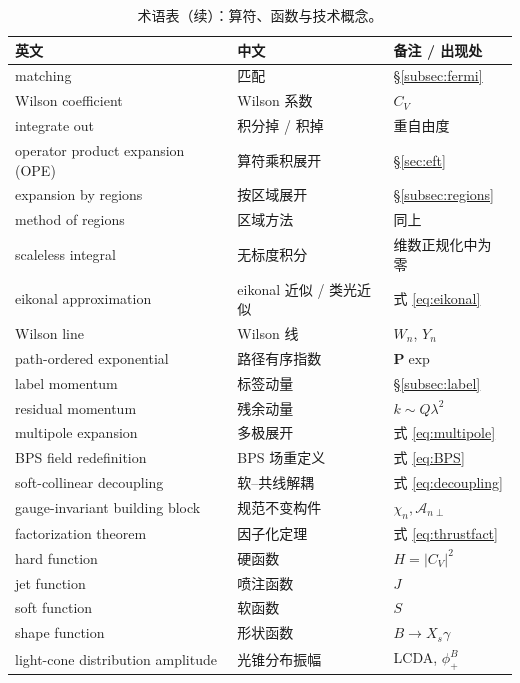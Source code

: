 \documentclass[UTF8,a4paper,11pt]{ctexart}
\theoremstyle{definition}
\theoremstyle{remark}
\theoremstyle{plain}
\newcommand{\Pexp}{\mathbf{P}\exp}
\begin{document}
\begin{table}[htbp]
\centering
\caption{术语表（续）：算符、函数与技术概念。}
\label{tab:terms2}
\begin{tabular}{@{}lll@{}}
\toprule
英文 & 中文 & 备注 / 出现处 \\
\midrule
matching                          & 匹配                & \S\ref{subsec:fermi} \\
Wilson coefficient                & Wilson 系数         & $C_V$ \\
integrate out                     & 积分掉 / 积掉       & 重自由度 \\
operator product expansion (OPE)  & 算符乘积展开        & \S\ref{sec:eft} \\
expansion by regions              & 按区域展开          & \S\ref{subsec:regions} \\
method of regions                 & 区域方法            & 同上 \\
scaleless integral                & 无标度积分          & 维数正规化中为零 \\
eikonal approximation             & eikonal 近似 / 类光近似 & 式 \eqref{eq:eikonal} \\
Wilson line                       & Wilson 线           & $W_n$, $Y_n$ \\
path-ordered exponential          & 路径有序指数        & $\Pexp$ \\
label momentum                    & 标签动量            & \S\ref{subsec:label} \\
residual momentum                 & 残余动量            & $k\sim Q\lambda^2$ \\
multipole expansion               & 多极展开            & 式 \eqref{eq:multipole} \\
BPS field redefinition            & BPS 场重定义        & 式 \eqref{eq:BPS} \\
soft-collinear decoupling         & 软--共线解耦        & 式 \eqref{eq:decoupling} \\
gauge-invariant building block    & 规范不变构件        & $\chi_n,\mathcal A_{n\perp}$ \\
factorization theorem             & 因子化定理          & 式 \eqref{eq:thrustfact} \\
hard function                     & 硬函数              & $H=|C_V|^2$ \\
jet function                      & 喷注函数            & $J$ \\
soft function                     & 软函数              & $S$ \\
shape function                    & 形状函数            & $B\to X_s\gamma$ \\
light-cone distribution amplitude & 光锥分布振幅        & LCDA, $\phi_+^B$ \\
\bottomrule
\end{tabular}
\end{table}
\end{document}
